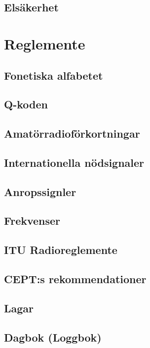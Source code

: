 \documentclass[10pt,openright]{report}
\begin{document}
\chapter{Elsäkerhet}



\setcounter{part}{17}
\setcounter{chapter}{0}
\part{Reglemente}

\chapter{Fonetiska alfabetet}


\chapter{Q-koden}


\chapter{Amatörradioförkortningar}


\chapter{Internationella nödsignaler}


\chapter{Anropssignler}


\chapter{Frekvenser}


\chapter{ITU Radioreglemente}


\chapter{CEPT:s rekommendationer}


\chapter{Lagar}


\chapter{Dagbok (Loggbok)}

\end{document}
